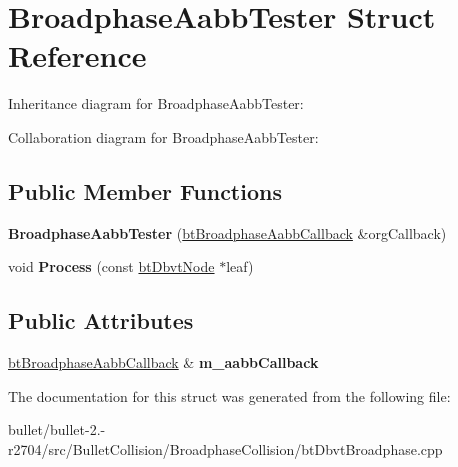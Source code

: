 \hypertarget{struct_broadphase_aabb_tester}{\section{Broadphase\+Aabb\+Tester Struct Reference}
\label{struct_broadphase_aabb_tester}
}


Inheritance diagram for Broadphase\+Aabb\+Tester\+:


Collaboration diagram for Broadphase\+Aabb\+Tester\+:
\subsection*{Public Member Functions}
\begin{DoxyCompactItemize}
\item 
\hypertarget{struct_broadphase_aabb_tester_a7afe63b7de086ff8a329ba6ed6abf880}{{\bfseries Broadphase\+Aabb\+Tester} (\hyperlink{structbt_broadphase_aabb_callback}{bt\+Broadphase\+Aabb\+Callback} \&org\+Callback)}\label{struct_broadphase_aabb_tester_a7afe63b7de086ff8a329ba6ed6abf880}

\item 
\hypertarget{struct_broadphase_aabb_tester_a6c6a2efd374d3805aa9dc877fd5d93e6}{void {\bfseries Process} (const \hyperlink{structbt_dbvt_node}{bt\+Dbvt\+Node} $\ast$leaf)}\label{struct_broadphase_aabb_tester_a6c6a2efd374d3805aa9dc877fd5d93e6}

\end{DoxyCompactItemize}
\subsection*{Public Attributes}
\begin{DoxyCompactItemize}
\item 
\hypertarget{struct_broadphase_aabb_tester_a97d64cd751729e44a3420d29201e71ba}{\hyperlink{structbt_broadphase_aabb_callback}{bt\+Broadphase\+Aabb\+Callback} \& {\bfseries m\+\_\+aabb\+Callback}}\label{struct_broadphase_aabb_tester_a97d64cd751729e44a3420d29201e71ba}

\end{DoxyCompactItemize}


The documentation for this struct was generated from the following file\+:\begin{DoxyCompactItemize}
\item 
bullet/bullet-\/2.-\/r2704/src/\+Bullet\+Collision/\+Broadphase\+Collision/bt\+Dbvt\+Broadphase.\+cpp\end{DoxyCompactItemize}
